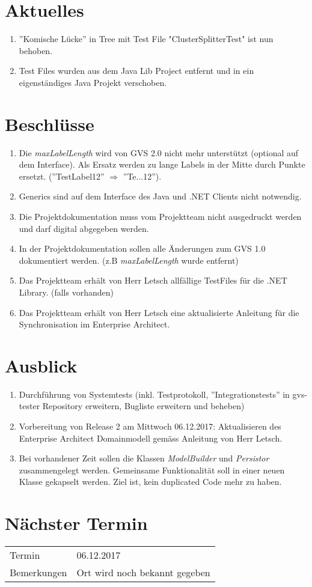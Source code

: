 \documentclass[11pt, a4paper,oneside]{scrartcl}
\begin{document}
	\section{Aktuelles}
		\begin{enumerate}
		\item ''Komische Lücke'' in Tree mit Test File "ClusterSplitterTest" ist nun behoben.
		\item Test Files wurden aus dem Java Lib Project entfernt und in ein eigenständiges Java Projekt verschoben.
	\end{enumerate} 
	
	\section{Beschlüsse}
	\begin{enumerate}
		\item Die \textit{maxLabelLength} wird von GVS 2.0 nicht mehr unterstützt (optional auf dem Interface). Als Ersatz werden zu lange Labels in der Mitte durch Punkte ersetzt. (''TestLabel12'' $\Rightarrow$ ''Te...12'').
		\item Generics sind auf dem Interface des Java und .NET Clients nicht notwendig.
		\item Die Projektdokumentation muss vom Projektteam nicht ausgedruckt werden und darf digital abgegeben werden.	
		\item In der Projektdokumentation sollen alle Änderungen zum GVS 1.0 dokumentiert werden. (z.B \textit{maxLabelLength} wurde entfernt)
		\item Das Projektteam erhält von Herr Letsch allfällige TestFiles für die .NET Library. (falls vorhanden)
		\item Das Projektteam erhält von Herr Letsch eine aktualisierte Anleitung für die Synchronisation im Enterprise Architect.
	\end{enumerate} 
	
	\section{Ausblick}
	\begin{enumerate}
		\item Durchführung von Systemtests (inkl. Testprotokoll, ''Integrationstests'' in gvs-tester Repository erweitern, Bugliste erweitern und beheben)
		\item Vorbereitung von Release 2 am Mittwoch 06.12.2017: Aktualisieren des Enterprise Architect Domainmodell gemäss Anleitung von Herr Letsch.
		\item Bei vorhandener Zeit sollen die Klassen \textit{ModelBuilder} und \textit{Persistor} zusammengelegt werden. Gemeinsame Funktionalität soll in einer neuen Klasse gekapselt werden. Ziel ist, kein duplicated Code mehr zu haben.
	\end{enumerate}
	
	\section{Nächster Termin}
	\begin{tabu} to \linewidth {l X }
		\toprule
		Termin & 06.12.2017  \\
		Bemerkungen & Ort wird noch bekannt gegeben  \\
		\bottomrule
	\end{tabu}
	
\end{document}
